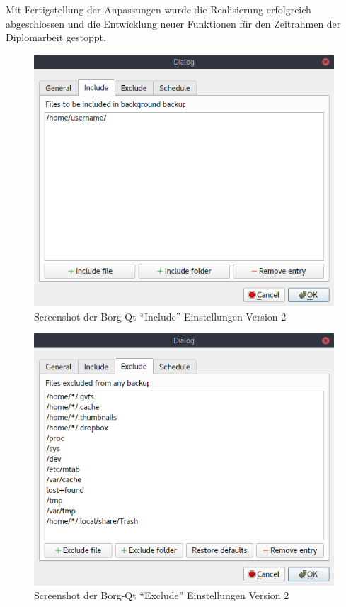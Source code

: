 Mit Fertigstellung der Anpassungen wurde die Realisierung erfolgreich
abgeschlossen und die Entwicklung neuer Funktionen für den Zeitrahmen der
Diplomarbeit gestoppt.

\newpage
\begin{figure}[H]
\centering
\includegraphics[height=.40\textheight]{pictures/borgqt_settings_include_v2.png}
\caption{\label{fig:org7af081d}
Screenshot der Borg-Qt "`Include"' Einstellungen Version 2}
\end{figure}

\begin{figure}[H]
\centering
\includegraphics[height=.40\textheight]{pictures/borgqt_settings_exclude_v2.png}
\caption{\label{fig:org562e65a}
Screenshot der Borg-Qt "`Exclude"' Einstellungen Version 2}
\end{figure}

